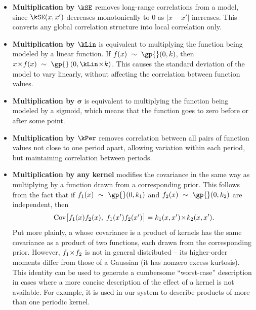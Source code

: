 \begin{itemize}
\item {\bf Multiplication by $\kSE$} removes long-range correlations from a model, since $\kSE(x,x')$ decreases monotonically to 0 as $|x - x'|$ increases.
This converts any global correlation structure into local correlation only.

\item {\bf Multiplication by $\kLin$} is equivalent to multiplying the function being modeled by a linear function.
If $f(x) \dist \gp{}(0, \kernel)$, then $x \kerntimes f(x) \dist \gp{}\left(0, \kLin \kerntimes k \right)$.
This causes the standard deviation of the model to vary linearly, without affecting the correlation between function values.

\item {\bf Multiplication by $\boldsymbol\sigma$} is equivalent to multiplying the function being modeled by a sigmoid, which means that the function goes to zero before or after some point.

\item {\bf Multiplication by $\kPer$}
removes correlation between all pairs of function values not close to one period apart, allowing variation within each period, but maintaining correlation between periods.

\item {\bf Multiplication by any kernel}
modifies the covariance in the same way as multiplying by a function drawn from a corresponding \gp{} prior.
This follows from the fact that if ${f_1(x) \dist \gp{}(0, \kernel_1)}$ and ${f_2(x) \dist \gp{}(0, \kernel_2)}$ are independent, then
%
\begin{align}
{\textrm{Cov} \big[f_1(x)f_2(x), \; f_1(x')f_2(x') \big] = k_1(x,x')  \! \times \!k_2(x,x')}.
\end{align}
%
Put more plainly, a \gp{} whose covariance is a product of kernels has the same covariance as a product of two functions, each drawn from the corresponding \gp{} prior.
However, $f_1 \! \times \! f_2$ is not in general \gp{} distributed -- its higher-order moments differ from those of a Gaussian (\eg it has nonzero excess kurtosis).
This identity can be used to generate a cumbersome ``worst-case'' description in cases where a more concise description of the effect of a kernel is not available.
For example, it is used in our system to describe products of more than one periodic kernel.
\end{itemize}

